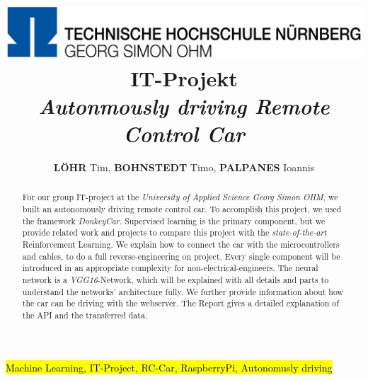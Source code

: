 \documentclass[journal]{IEEEtran}
\begin{document}
	
    \title{    
    \includegraphics[width=7.5in]{photo/logo.png}
    \newline \newline
     IT-Projekt \\ 
     \textit{Autonmously driving Remote Control Car
     \\ }
     }

  \author{
      \textbf{L\"OHR} Tim,
      \textbf{BOHNSTEDT} Timo, 
      \textbf{PALPANES} Ioannis
}



\maketitle
\begin{abstract}
For our group IT-project at the \textit{University of Applied Science Georg Simon OHM}, we built an autonomously driving remote control car. To accomplish this project, we used the framework \textit{DonkeyCar}. Supervised learning is the primary component, but we provide related work and projects to compare this project with the \textit{state-of-the-art} Reinforcement Learning. We explain how to connect the car with the microcontrollers and cables, to do a full reverse-engineering on project. Every single component will be introduced in an appropriate complexity for non-electrical-engineers.  The neural network is a \textit{VGG16}-Network, which will be explained with all details and parts to understand the networks' architecture fully. We further provide information about how the car can be driving with the webserver. The Report gives a detailed explanation of the API and the transferred data.
\end{abstract}
\begin{IEEEkeywords}
\hl{Machine Learning, IT-Project, RC-Car, RaspberryPi, Autonomusly driving}
\end{IEEEkeywords}
\IEEEpeerreviewmaketitle
\end{document}
